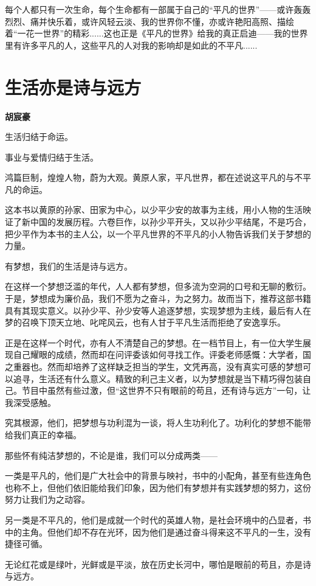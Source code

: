 \documentclass[openany,scheme = chinese, linespread = 1.5]{ctexbook}
\newcommand \name[1]{\begin{center} \kaishu \Large \bfseries #1 \end{center}}
\begin{document}
    每个人都只有一次生命，每个生命都有一部属于自己的“平凡的世界”——或许轰轰烈烈、痛并快乐着，或许风轻云淡、我的世界你不懂，亦或许艳阳高照、描绘着“一花一世界”的精彩......这也正是《平凡的世界》给我的真正启迪——我的世界里有许多平凡的人，这些平凡的人对我的影响却是如此的不平凡...... 
  
\newpage
\section{生活亦是诗与远方}
\name{胡宸豪}

生活归结于命运。

事业与爱情归结于生活。

鸿篇巨制，煌煌人物，蔚为大观。黄原人家，平凡世界，都在述说这平凡的与不平凡的命运。

这本书以黄原的孙家、田家为中心，以少平少安的故事为主线，用小人物的生活映证了新中国的发展历程。六卷巨作，以孙少平开头，又以孙少平结尾，不是巧合，把少平作为本书的主人公，以一个平凡世界的不平凡的小人物告诉我们关于梦想的力量。

有梦想，我们的生活是诗与远方。 

在这样一个梦想泛滥的年代，人人都有梦想，但多流为空洞的口号和无聊的敷衍。于是，梦想成为廉价品，我们不愿为之奋斗，为之努力。故而当下，推荐这部书籍具有其现实意义。以孙少平、孙少安等人追逐梦想，实现梦想为主线，最后有人在梦的召唤下顶天立地、叱咤风云，也有人甘于平凡生活而拒绝了安逸享乐。

正是在这样一个时代，亦有人不清楚自己的梦想。在一档节目上，有一位大学生展现自己耀眼的成绩，然而却在问评委该如何寻找工作。评委老师感慨：大学者，国之重器也。然而却培养了这样缺乏担当的学生，文凭再高，没有真实可感的梦想可以追寻，生活还有什么意义。精致的利己主义者，以为梦想就是当下精巧得包装自己。节目中虽然有些过激，但“这世界不只有眼前的苟且，还有诗与远方”一句，让我深受感触。

究其根源，他们，把梦想与功利混为一谈，将人生功利化了。功利化的梦想不能带给我们真正的幸福。

那些怀有纯洁梦想的，不论是谁，我们可以分成两类——

一类是平凡的，他们是广大社会中的背景与映衬，书中的小配角，甚至有些连角色也称不上，但他们依旧能给我们印象，因为他们有梦想并有实践梦想的努力，这份努力让我们为之动容。

另一类是不平凡的，他们是成就一个时代的英雄人物，是社会环境中的凸显者，书中的主角。但他们却不存在光环，因为他们是通过奋斗得来这不平凡的一生，没有捷径可循。

无论红花或是绿叶，光鲜或是平淡，放在历史长河中，哪怕是眼前的苟且，亦是诗与远方。
\end{document}
